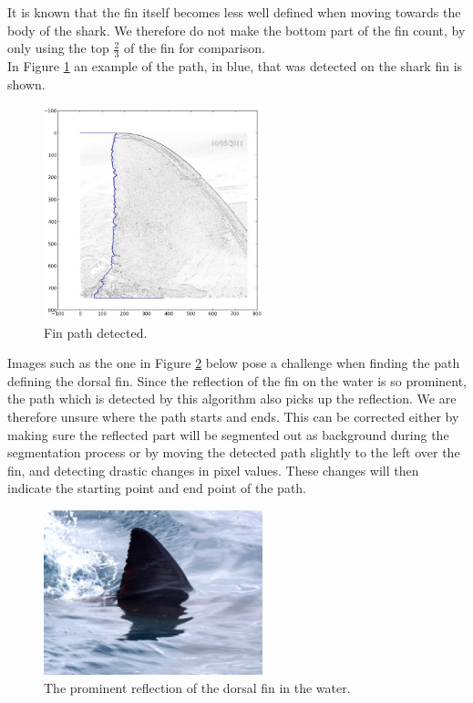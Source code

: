 \documentclass[a4paper,10pt]{article}
\begin{document}
    It is known that the fin itself becomes less well defined when moving towards the body of the shark.  
  We therefore do not make the bottom part of the fin count, by only using the top
$\frac{2}{3}$ of the fin for comparison.\\

In Figure \ref{fin} an example of the path, in blue, that was detected on the shark
fin is shown.
\begin{figure}[H]
 \centering
 \includegraphics[width=2.5in]{path.jpg}
 \caption{Fin path detected.}
 \label{fin}
\end{figure}

Images such as the one in Figure \ref{shadow} below pose a challenge when finding the path defining the dorsal fin.
Since the reflection of the fin on the water is so prominent, the path which is detected by this algorithm also
picks up the reflection.  We are therefore unsure
where the path starts and ends.  This can be corrected either by
making sure the reflected part will be segmented out as background during the segmentation process or by
moving the detected path slightly to the left over the fin, and detecting drastic changes in pixel
values.  These changes will then indicate the starting point and end point of the path.

\begin{figure}[H]
 \centering
 \includegraphics[width=2.5in]{reflectfin.jpg}
 \caption{The prominent reflection of the dorsal fin in the water.}
 \label{shadow}
\end{figure} 
\end{document}
